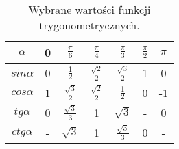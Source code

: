 \begin{table}[htbp]
\centering
\begin{tabular}{|c|c|c|c|c|c|c|}
\hline
$\alpha$    & 0 & $\frac{\pi}{6}$      & $\frac{\pi}{4}$      & $\frac{\pi}{3}$      & $\frac{\pi}{2}$ & $\pi$ \\ \hline
$sin\alpha$ & 0 & $\frac{1}{2}$        & $\frac{\sqrt{2}}{2}$ & $\frac{\sqrt{3}}{2}$ & 1               & 0     \\ \hline
$cos\alpha$ & 1 & $\frac{\sqrt{3}}{2}$ & $\frac{\sqrt{2}}{2}$ & $\frac{1}{2}$        & 0               & -1    \\ \hline
$tg\alpha$  & 0 & $\frac{\sqrt{3}}{3}$ & 1                    & $\sqrt{3}$           & -               & 0     \\ \hline
$ctg\alpha$ & - & $\sqrt{3}$           & 1                    & $\frac{\sqrt{3}}{3}$ & 0               & -     \\ \hline
\end{tabular}
\label{tab:wartosci_funkcji_trygonometrycznych}
\caption{Wybrane wartości funkcji trygonometrycznych.}
\end{table}